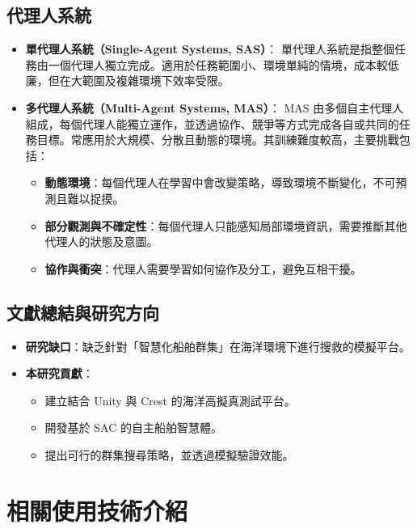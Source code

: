 \documentclass[12pt,a4paper]{ctexart}
\begin{document}
\subsection{代理人系統}

\begin{itemize}
  \item \textbf{單代理人系統（Single-Agent Systems, SAS）}：
  單代理人系統是指整個任務由一個代理人獨立完成。適用於任務範圍小、環境單純的情境，成本較低廉，但在大範圍及複雜環境下效率受限。
  
  \item \textbf{多代理人系統（Multi-Agent Systems, MAS）}：
  MAS 由多個自主代理人組成，每個代理人能獨立運作，並透過協作、競爭等方式完成各自或共同的任務目標。常應用於大規模、分散且動態的環境。其訓練難度較高，主要挑戰包括：
  \begin{itemize}
    \item \textbf{動態環境}：每個代理人在學習中會改變策略，導致環境不斷變化，不可預測且難以捉摸。
    \item \textbf{部分觀測與不確定性}：每個代理人只能感知局部環境資訊，需要推斷其他代理人的狀態及意圖。
    \item \textbf{協作與衝突}：代理人需要學習如何協作及分工，避免互相干擾。
  \end{itemize}
\end{itemize}

\subsection{文獻總結與研究方向}

\begin{itemize}
  \item \textbf{研究缺口}：缺乏針對「智慧化船舶群集」在海洋環境下進行搜救的模擬平台。
  \item \textbf{本研究貢獻}：
  \begin{itemize}
    \item 建立結合 Unity 與 Crest 的海洋高擬真測試平台。
    \item 開發基於 SAC 的自主船舶智慧體。
    \item 提出可行的群集搜尋策略，並透過模擬驗證效能。
  \end{itemize}
\end{itemize}

\section{相關使用技術介紹}
\end{document}
